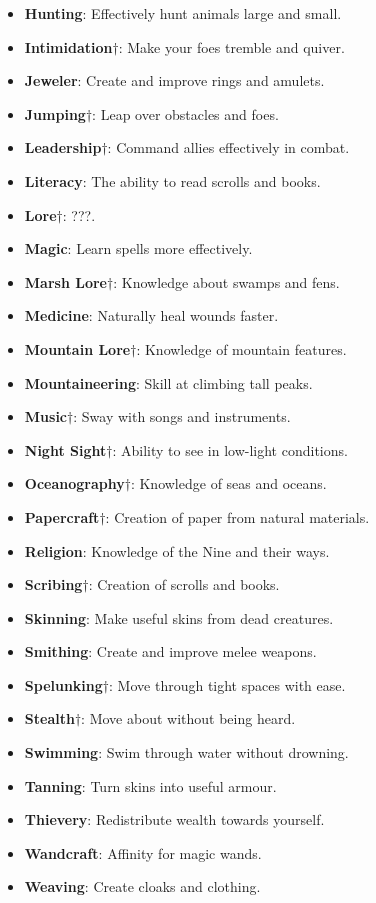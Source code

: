 \begin{itemize}
\item {\bf Hunting}: Effectively hunt animals large and small. 
\item {\bf Intimidation}$\dagger$: Make your foes tremble and quiver. 
\item {\bf Jeweler}: Create and improve rings and amulets. 
\item {\bf Jumping}$\dagger$: Leap over obstacles and foes.
\item {\bf Leadership}$\dagger$: Command allies effectively in combat. 
\item {\bf Literacy}: The ability to read scrolls and books.
\item {\bf Lore}$\dagger$: ???. 
\item {\bf Magic}: Learn spells more effectively. 
\item {\bf Marsh Lore}$\dagger$: Knowledge about swamps and fens. 
\item {\bf Medicine}: Naturally heal wounds faster. 
\item {\bf Mountain Lore}$\dagger$: Knowledge of mountain features. 
\item {\bf Mountaineering}: Skill at climbing tall peaks. 
\item {\bf Music}$\dagger$: Sway with songs and instruments. 
\item {\bf Night Sight}$\dagger$: Ability to see in low-light conditions. 
\item {\bf Oceanography}$\dagger$: Knowledge of seas and oceans. 
\item {\bf Papercraft}$\dagger$: Creation of paper from natural materials. 
\item {\bf Religion}: Knowledge of the Nine and their ways. 
\item {\bf Scribing}$\dagger$: Creation of scrolls and books. 
\item {\bf Skinning}: Make useful skins from dead creatures. 
\item {\bf Smithing}: Create and improve melee weapons.
\item {\bf Spelunking}$\dagger$: Move through tight spaces with ease.
\item {\bf Stealth}$\dagger$: Move about without being heard.
\item {\bf Swimming}: Swim through water without drowning.
\item {\bf Tanning}: Turn skins into useful armour.
\item {\bf Thievery}: Redistribute wealth towards yourself.
\item {\bf Wandcraft}: Affinity for magic wands.
\item {\bf Weaving}: Create cloaks and clothing.
\end{itemize}

